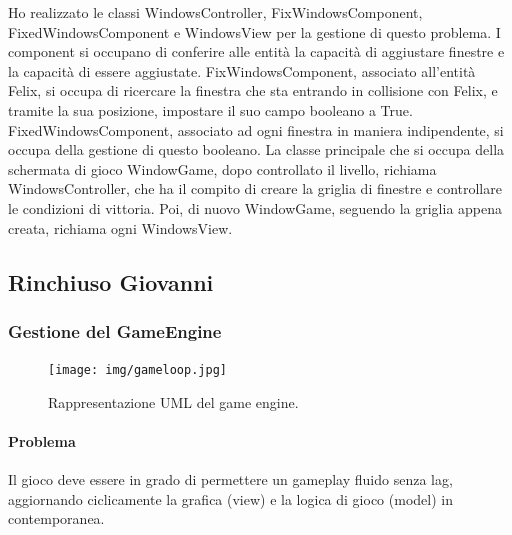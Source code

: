 \documentclass[a4paper,12pt]{report}
\begin{document}
Ho realizzato le classi WindowsController, FixWindowsComponent, FixedWindowsComponent e WindowsView per la gestione di questo problema. 
I component  si occupano di conferire alle entità la capacità di aggiustare finestre e la capacità di essere aggiustate.
FixWindowsComponent, associato all'entità Felix, si occupa di ricercare la finestra che sta entrando in collisione con Felix, e tramite la sua posizione, impostare il suo campo booleano a True.
FixedWindowsComponent, associato ad ogni finestra in maniera indipendente, si occupa della gestione di questo booleano.
La classe principale che si occupa della schermata di gioco WindowGame, dopo controllato il livello, richiama WindowsController, che ha il compito di creare la griglia di finestre e controllare le condizioni di vittoria.
Poi, di nuovo WindowGame, seguendo la griglia appena creata, richiama ogni WindowsView.



\subsection{Rinchiuso Giovanni}

\subsubsection{Gestione del GameEngine}

\begin{figure}[H]
\centering{}
\texttt{[image: img/gameloop.jpg]}
\caption{Rappresentazione UML del game engine.}
\end{figure}

\paragraph{Problema} Il gioco deve essere in grado di permettere un gameplay fluido senza lag, aggiornando ciclicamente la grafica (view) e la logica di gioco (model) in contemporanea.
\end{document}
